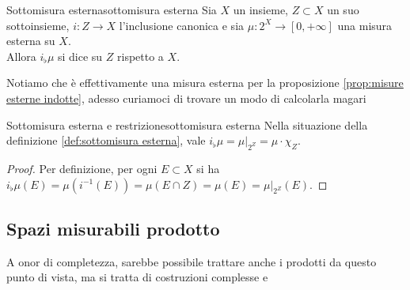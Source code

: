 \documentclass{article}
\begin{document}
\begin{definition}{Sottomisura esterna}{sottomisura esterna}
    Sia $X$ un insieme, $Z\subset X$ un suo sottoinsieme, $i:Z\to X$ l'inclusione canonica e sia $\mu : 2^X \to [0,+\infty]$ una misura esterna su $X$.\\
    Allora $i_\flat \mu$ si dice  su $Z$ rispetto a $X$.
\end{definition}

Notiamo che è effettivamente una misura esterna per la proposizione \ref{prop:misure esterne indotte}, adesso curiamoci di trovare un modo di calcolarla magari

\begin{proposition}{Sottomisura esterna e restrizione}{sottomisura esterna}
    Nella situazione della definizione \ref{def:sottomisura esterna}, vale $i_\flat \mu = \mu|_{2^Z} = \mu \cdot \chi_Z$.
    \begin{proof}
        Per definizione, per ogni $E\subset X$ si ha $i_\flat \mu(E) = \mu(i^{-1}(E)) = \mu(E\cap Z) = \mu(E) = \mu|_{2^Z}(E)$.
    \end{proof}
\end{proposition}

\pagebreak
\subsection{Spazi misurabili prodotto}

A onor di completezza, sarebbe possibile trattare anche i prodotti da questo punto di vista, ma si tratta di costruzioni complesse e 
\end{document}
